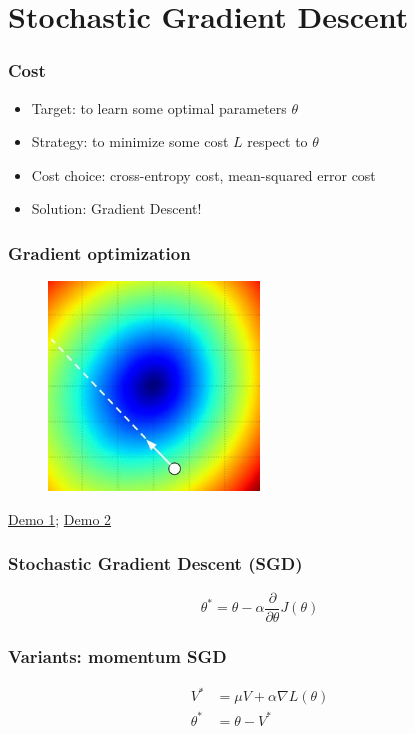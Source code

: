 \documentclass{beamer}
\begin{document}
\section{Stochastic Gradient Descent}

\begin{frame}
  \frametitle{Cost}
  \begin{itemize}
    \item Target: to learn some optimal parameters $\theta$
    \item Strategy: to minimize some cost $L$ respect to $\theta$
    \item Cost choice: cross-entropy cost, mean-squared error cost
    \item Solution: Gradient Descent!
  \end{itemize}
\end{frame}

\begin{frame}
  \frametitle{Gradient optimization}
  \begin{figure}
    \centering
    \includegraphics[width=0.5\textwidth]{stepsize.jpg}
  \end{figure}

  \href{http://rt.dgyblog.com/res/dlworkshop/opt1.gif}{Demo 1}; \href{http://rt.dgyblog.com/res/dlworkshop/opt2.gif}{Demo 2}
\end{frame}

\begin{frame}
  \frametitle{Stochastic Gradient Descent (SGD)}

  \begin{equation*}
    \theta^{*}=\theta-\alpha\frac{\partial}{\partial \theta}J(\theta)
  \end{equation*}
\end{frame}


\begin{frame}
  \frametitle{Variants: momentum SGD}

  \begin{align*}
    V^{*}&=\mu V+\alpha\nabla L(\theta) \\
    \theta^{*}&=\theta-V^{*}
  \end{align*}
\end{frame}
\end{document}

